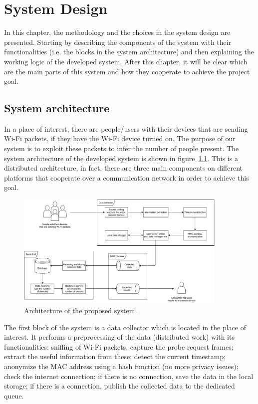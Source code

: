 \chapter{System Design}
\label{cha:system}
\vspace{0.4 cm} 

In this chapter, the methodology and the choices in the system design are presented. Starting by describing the components of the system with their functionalities (i.e. the blocks in the system architecture) and then explaining the working logic of the developed system. After this chapter, it will be clear which are the main parts of this system and how they cooperate to achieve the project goal.


\section{System architecture}
\label{sec:sysarc}
\vspace{0.2 cm} 

In a place of interest, there are people/users with their devices that are sending Wi-Fi packets, if they have the Wi-Fi device turned on. The purpose of our system is to exploit these packets to infer the number of people present. The system architecture of the developed system is shown in figure~\ref{fig:architecture}.
This is a distributed architecture, in fact, there are three main components on different platforms that cooperate over a communication network in order to achieve this goal.

\begin{figure}[h]
\centering 
\includegraphics[width=0.9\textwidth]{images/architecture} 
\caption{Architecture of the proposed system.}
\label{fig:architecture}
\end{figure}

The first block of the system is a data collector which is located in the place of interest. It performs a preprocessing of the data (distributed work) with its functionalities: sniffing of Wi-Fi packets, capture the probe request frames; extract the useful information from these; detect the current timestamp; anonymize the MAC address using a hash function (no more privacy issues); check the internet connection; if there is no connection, save the data in the local storage; if there is a connection, publish the collected data to the dedicated queue.

